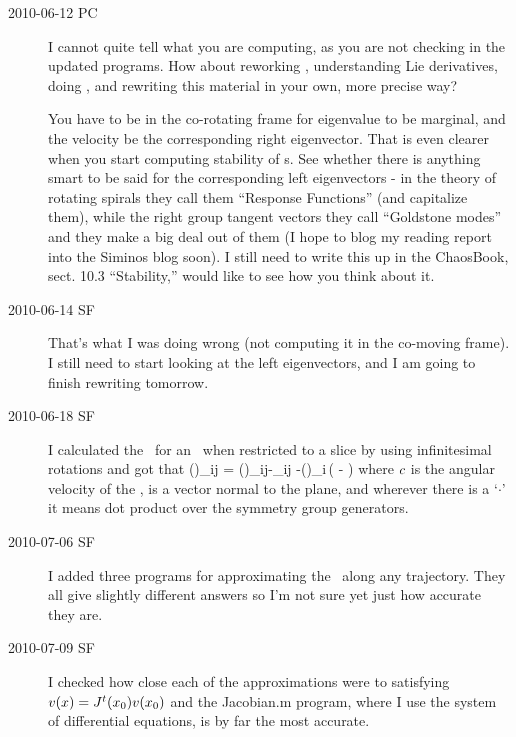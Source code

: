 \begin{description}
\item[2010-06-12 PC]
I cannot quite tell what you are computing, as you are not
checking in the updated programs.
How about reworking ,
understanding Lie derivatives,
doing ,
and rewriting this material in your own, more precise way?

You have to be in the co-rotating
frame for eigenvalue to be marginal, and the velocity
be the corresponding right eigenvector. That is even
clearer when you start computing stability of \rpo s.
See whether there is anything smart to be said for the
corresponding left eigenvectors - in the theory of
rotating spirals they call them
``Response Functions'' (and capitalize them), while the
right group tangent vectors they call ``Goldstone
modes'' and they make a big deal out of them
(I hope to blog my reading report into
the Siminos blog soon). I still need to write this
up in the ChaosBook, sect. 10.3 ``Stability,'' would like
to see how you think about it.

\item[2010-06-14 SF]
That's what I was doing wrong (not computing it in the co-moving frame). I still need to start looking at the left eigenvectors, and I am going to finish rewriting  tomorrow.

\item[2010-06-18 SF]
I calculated the \stabmat\ for an \reqv\ when restricted to a slice by using infinitesimal rotations and got that
\beq
{\MvarRed}(\sspRed)_{ij} = \Mvar(\sspRed)_{ij}-\velRel \cdot \Lg_{ij}
     -\groupTan(\sspRed)_i\,\left(
     - \velRel {}
              \right)
where $c$ is the angular velocity of the \reqv, \sliceTan{} is a vector normal to the plane, and wherever there is a `$\cdot$' it means dot product
over the symmetry group generators.

\item[2010-07-06 SF]
I added three programs for approximating the \jacobianM\ along any trajectory. They all give slightly different answers so I'm not sure yet just how accurate they are.

\item[2010-07-09 SF]
I checked how close each of the approximations were to satisfying $v(x)=J^t({x_0}) v({x_0})$ and the Jacobian.m program, where I use the system of differential equations, is by far the most accurate.


\end{description}
